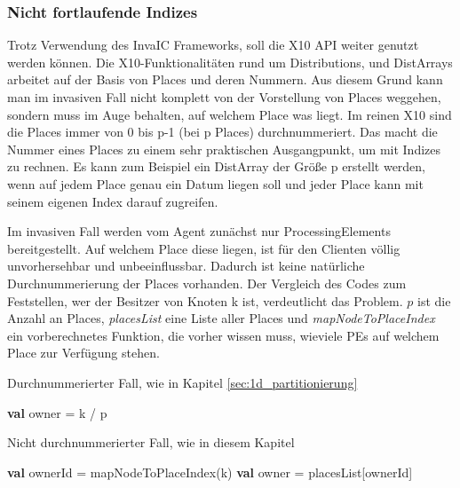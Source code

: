 \subsubsection{Nicht fortlaufende Indizes} %
\label{ssub:nicht_fortlaufende_indizes}
Trotz Verwendung des InvaIC Frameworks, soll die X10 API weiter genutzt werden können. Die X10-Funktionalitäten rund um Distributions, und DistArrays arbeitet auf der Basis von Places und deren Nummern. Aus diesem Grund kann man im invasiven Fall nicht komplett von der Vorstellung von Places weggehen, sondern muss im Auge behalten, auf welchem Place was liegt. Im reinen X10 sind die Places immer von 0 bis p-1 (bei p Places) durchnummeriert. Das macht die Nummer eines Places zu einem sehr praktischen Ausgangpunkt, um mit Indizes zu rechnen. Es kann zum Beispiel ein DistArray der Größe p erstellt werden, wenn auf jedem Place genau ein Datum liegen soll und jeder Place kann mit seinem eigenen Index darauf zugreifen.

Im invasiven Fall werden vom Agent zunächst nur ProcessingElements bereitgestellt. Auf welchem Place diese liegen, ist für den Clienten völlig unvorhersehbar und unbeeinflussbar. Dadurch ist keine natürliche Durchnummerierung der Places vorhanden. Der Vergleich des Codes zum Feststellen, wer der Besitzer von Knoten k ist, verdeutlicht das Problem. $p$ ist die Anzahl an Places, \textit{placesList} eine Liste aller Places und \textit{mapNodeToPlaceIndex} ein vorberechnetes Funktion, die vorher wissen muss, wieviele PEs auf welchem Place zur Verfügung stehen.
\begin{algorithm}
	\caption{Durchnummerierter Fall, wie in Kapitel \ref{sec:1d_partitionierung}}
	\label{alg:owner_consecutive}
	\begin{algorithmic}[1]
		\State \textbf{val} owner = k / p
	\end{algorithmic}
\end{algorithm}

\begin{algorithm}
	\caption{Nicht durchnummerierter Fall, wie in diesem Kapitel}
	\label{alg:owner_random}
	\begin{algorithmic}[1]
		\State \textbf{val} ownerId = mapNodeToPlaceIndex(k)
		\State \textbf{val} owner   = placesList[ownerId]
	\end{algorithmic}
\end{algorithm}

